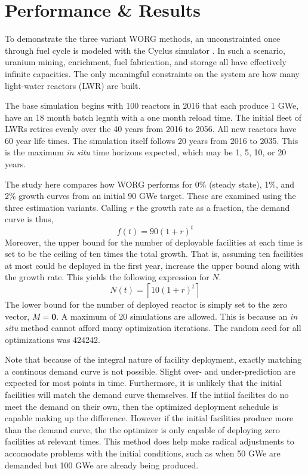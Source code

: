 \section{Performance \& Results}
\label{results}

To demonstrate the three variant WORG methods, an unconstrainted once 
through fuel cycle is modeled with the Cyclus simulator 
\cite{DBLP:journals/corr/HuffGCFMOSSW15}. In such a scenario, uranium
mining, enrichment, fuel fabrication, and storage all have effectively 
infinite capacities. The only meaningful constraints on the system are
how many light-water reactors (LWR) are built.

The base simulation begins with 100 reactors in 2016 that each produce
1 GWe, have an 18 month batch legnth with a one month reload time.
The initial fleet of LWRs retires evenly over the 40 years from 2016 to 
2056. All new reactors have 60 year life times.  The simulation itself 
follows 20 years from 2016 to 2035. This is the maximum \emph{in situ} time 
horizons expected, which may be 1, 5, 10, or 20 years.

The study here compares how WORG performs for 0\% (steady state), 1\%, 
and 2\% growth curves from an initial 90 GWe target. These are examined
using the three estimation variants.  Calling $r$ the growth rate as a 
fraction, the demand curve is thus,
\begin{equation}
\label{f-rate}
f(t) = 90 (1 + r)^t
\end{equation}
Moreover, the upper bound for the number of deployable facilities at 
each time is set to be the ceiling of ten times the total growth. 
That is, assuming ten facilities at most could be deployed in the first
year, increase the upper bound along with the growth rate.  This yields
the following expression for $N$.
\begin{equation}
\label{n-rate}
N(t) = \left\lceil 10 (1 + r)^t\right\rceil
\end{equation}
The lower bound for the number of deployed reactor is simply set to the 
zero vector, $M = \mathbf{0}$.  A maximum of 20 simulations are allowed.
This is because an \emph{in situ} method cannot afford many optimization 
iterations. The random seed for all optimizations was 424242.

Note that because of the integral nature of facility deployment, 
exactly matching a continous demand curve is not possible. Slight over- 
and under-prediction are expected for most points in time. Furthermore, 
it is unlikely that the initial facilities will match the demand curve 
themselves. If the intiial facilites do no meet the demand on their own, 
then the optimized deployment schedule is capable making up the difference.
However if the initial facilities produce more than the demand curve, 
the the optimizer is only capable of deploying zero facilities at relevant
times. This method does help make radical adjustments to accomodate 
problems with the initial conditions, such as when 50 GWe are demanded 
but 100 GWe are already being produced.

